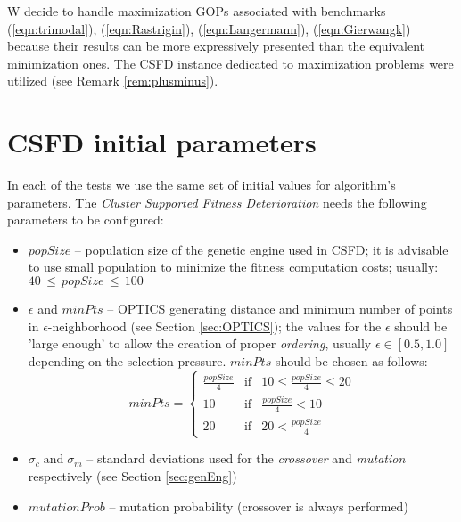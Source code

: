 W decide to handle maximization GOPs associated with benchmarks
(\ref{eqn:trimodal}), (\ref{eqn:Rastrigin}), (\ref{eqn:Langermann}),
(\ref{eqn:Gierwangk}) because their results can be more
expressively presented than the equivalent minimization ones. 
The CSFD instance dedicated to maximization problems
were utilized (see Remark \ref{rem:plusminus}).


\section{CSFD initial parameters}
\label{sec:InitPar}


In each of the tests we use the same set of initial values for algorithm's
parameters. The \textit{Cluster Supported Fitness Deterioration} needs the
following parameters to be configured: 
\begin{itemize}
  
  \item $popSize$ -- population size of the genetic engine used in CSFD;
  it is advisable to use small population to minimize the fitness computation
  costs; usually: $40 \, \leq \, popSize \, \leq \, 100$
  
  \item $\epsilon$ and $minPts$ -- OPTICS generating distance and minimum number
  of points in $\epsilon$-neighborhood (see Section \ref{sec:OPTICS});
  the values for the $\epsilon$ should be 'large enough' to allow
  the creation of proper \textit{ordering}, usually $\epsilon \in [0.5, 1.0]$
  depending on the selection pressure. $minPts$ should be chosen as follows:
  \begin{equation}
  \label{eqn:minPts}
  minPts = \left\{
  \begin{array}{ccc}
  \frac{popSize}{4} & \text{if} & 10 \leq \frac{popSize}{4} \leq  20\\
  10 & \text{if} & \frac{popSize}{4} < 10\\
  20 & \text{if} & 20 < \frac{popSize}{4}
  \end{array}
  \right.
  \end{equation}
  
  \item $\sigma_c \; \text{and} \; \sigma_m$ -- standard
  deviations used for the \textit{crossover} and \textit{mutation} respectively
  (see Section \ref{sec:genEng})
  
  \item $mutationProb$ -- mutation probability (crossover is always performed)
   
\end{itemize}

